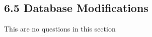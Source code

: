 \documentclass[../../main.tex]{subfiles}
\begin{document}
\subsection{6.5 Database Modifications}

This are no questions in this section
\end{document}

